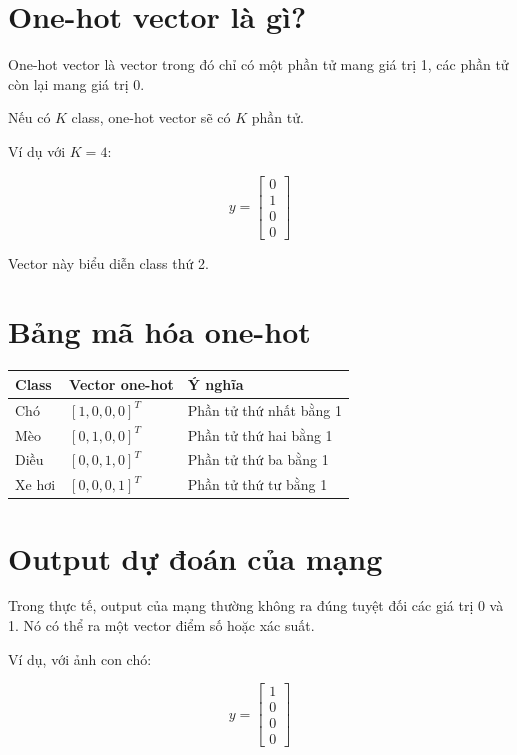 \documentclass[12pt,a4paper]{report}
\begin{document}
\section{One-hot vector là gì?}

One-hot vector là vector trong đó chỉ có một phần tử mang giá trị 1, các phần tử còn lại mang giá trị 0.

Nếu có $K$ class, one-hot vector sẽ có $K$ phần tử.

Ví dụ với $K=4$:

\[
    y =
    \begin{bmatrix}
    0\\
    1\\
    0\\
    0
    \end{bmatrix}
\]

Vector này biểu diễn class thứ 2.

\section{Bảng mã hóa one-hot}

\begin{center}
\begin{tabular}{lll}
\toprule
Class & Vector one-hot & Ý nghĩa \\
\midrule
Chó & $[1,0,0,0]^T$ & Phần tử thứ nhất bằng 1 \\
Mèo & $[0,1,0,0]^T$ & Phần tử thứ hai bằng 1 \\
Diều & $[0,0,1,0]^T$ & Phần tử thứ ba bằng 1 \\
Xe hơi & $[0,0,0,1]^T$ & Phần tử thứ tư bằng 1 \\
\bottomrule
\end{tabular}
\end{center}

\section{Output dự đoán của mạng}

Trong thực tế, output của mạng thường không ra đúng tuyệt đối các giá trị 0 và 1. Nó có thể ra một vector điểm số hoặc xác suất.

Ví dụ, với ảnh con chó:

\[
    y =
    \begin{bmatrix}
    1\\0\\0\\0
    \end{bmatrix}
\]
\end{document}
